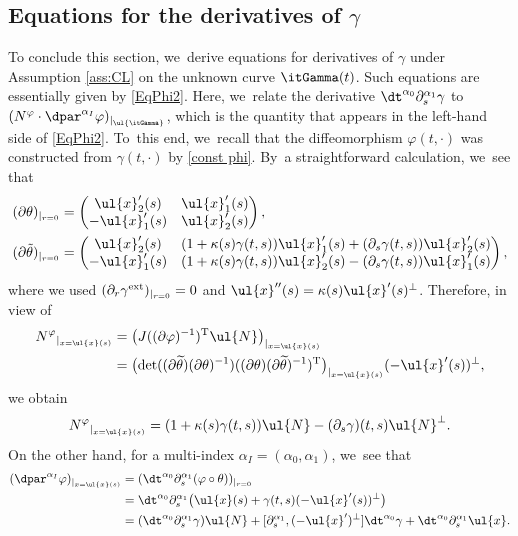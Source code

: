 \subsection{Equations for the derivatives of $\gamma$}\label{subsect:Eqg}
To conclude this section, we~derive equations for derivatives of $\gamma$ under Assumption \ref{ass:CL} on the unknown curve $\itGamma(t)$.
Such equations are essentially given by \eqref{EqPhi2}.
Here, we~relate the derivative $\dt^{\alpha_0}\partial_s^{\alpha_1}\gamma$ to $(N^\varphi\cdot\dpar^{\alpha_I}\varphi)_{\vert_{\ul{\itGamma}}}$,
which is the quantity that appears in the left-hand side of \eqref{EqPhi2}.
To~this end, we~recall that the diffeomorphism $\varphi(t,\cdot)$ was constructed from $\gamma(t,\cdot)$ by \eqref{const phi}. By~a straightforward calculation, we~see that
\begin{align*}
(\partial\theta)_{\vert_{r=0}} &=
\begin{pmatrix}
\ul{x}_2'(s) & \ul{x}_1'(s) \\
-\ul{x}_1'(s) & \ul{x}_2'(s)
\end{pmatrix}, \\
(\partial\tilde{\theta})_{\vert_{r=0}} &=
\begin{pmatrix}
\ul{x}_2'(s) & (1+\kappa(s)\gamma(t,s))\ul{x}_1'(s) + (\partial_s\gamma(t,s))\ul{x}_2'(s) \\
-\ul{x}_1'(s) & (1+\kappa(s)\gamma(t,s))\ul{x}_2'(s) - (\partial_s\gamma(t,s))\ul{x}_1'(s)
\end{pmatrix},
\end{align*}
where we used $(\partial_r\gamma^{\rm ext})_{\vert_{r=0}} = 0$ and $\ul{x}''(s) = \kappa(s)\ul{x}'(s)^\perp$.
Therefore, in view of
\begin{align*}
{N^\varphi}_{\vert_{x=\ul{x}(s)}}
&= \bigl(J((\partial\varphi)^{-1})^\mathrm{T}\ul{N}\bigr)_{\vert_{x=\ul{x}(s)}}\\
&= \bigl(\det((\partial\widetilde{\theta})(\partial\theta)^{-1}) ((\partial\theta)(\partial\widetilde{\theta})^{-1})^\mathrm{T}\bigr)_{\vert_{x=\ul{x}(s)}}
(-\ul{x}'(s))^\perp,
\end{align*}
we obtain
\begin{equation}\label{Nphi2}
{N^\varphi}_{\vert_{x=\ul{x}(s)}}
= (1+\kappa(s)\gamma(t,s))\ul{N} - (\partial_s\gamma)(t,s)\ul{N}^\perp.
\end{equation}
On the other hand, for a multi-index $\alpha_I=(\alpha_0,\alpha_1)$, we~see that
\begin{align*}
(\dpar^{\alpha_I}\varphi)_{\vert_{x=\ul{x}(s)}}
&= (\dt^{\alpha_0}\partial_s^{\alpha_1}(\varphi\circ\theta))_{\vert_{r=0}} \\
&= \dt^{\alpha_0}\partial_s^{\alpha_1}\bigl(\ul{x}(s)+\gamma(t,s)(-\ul{x}'(s))^\perp \bigr) \\
&= (\dt^{\alpha_0}\partial_s^{\alpha_1}\gamma)\ul{N}
+ [\partial_s^{\alpha_1},(-\ul{x}')^\perp]\dt^{\alpha_0}\gamma + \dt^{\alpha_0}\partial_s^{\alpha_1}\ul{x}.
\end{align*}
